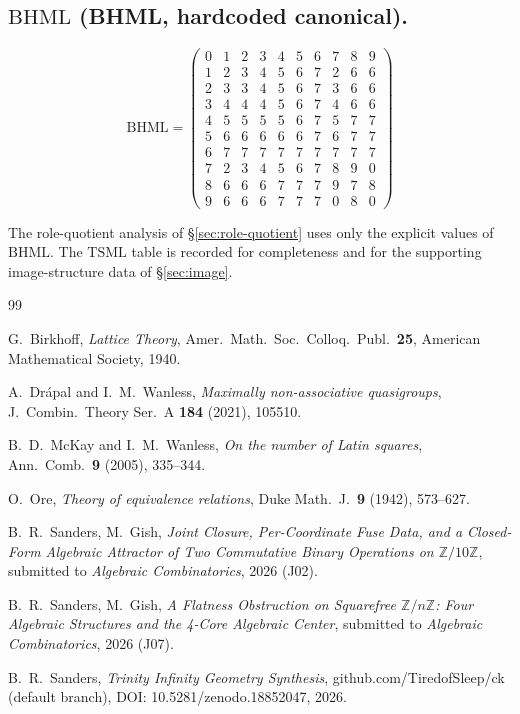 \documentclass[11pt,reqno]{amsart}
\theoremstyle{plain}
\theoremstyle{definition}
\theoremstyle{remark}
\newcommand{\Z}{\mathbb{Z}}
\newcommand{\TS}{\mathrm{TSML}}
\newcommand{\BH}{\mathrm{BHML}}
\begin{document}
\subsection*{$\BH$ (BHML, hardcoded canonical).}

\[
\BH =
\begin{pmatrix}
0 & 1 & 2 & 3 & 4 & 5 & 6 & 7 & 8 & 9 \\
1 & 2 & 3 & 4 & 5 & 6 & 7 & 2 & 6 & 6 \\
2 & 3 & 3 & 4 & 5 & 6 & 7 & 3 & 6 & 6 \\
3 & 4 & 4 & 4 & 5 & 6 & 7 & 4 & 6 & 6 \\
4 & 5 & 5 & 5 & 5 & 6 & 7 & 5 & 7 & 7 \\
5 & 6 & 6 & 6 & 6 & 6 & 7 & 6 & 7 & 7 \\
6 & 7 & 7 & 7 & 7 & 7 & 7 & 7 & 7 & 7 \\
7 & 2 & 3 & 4 & 5 & 6 & 7 & 8 & 9 & 0 \\
8 & 6 & 6 & 6 & 7 & 7 & 7 & 9 & 7 & 8 \\
9 & 6 & 6 & 6 & 7 & 7 & 7 & 0 & 8 & 0
\end{pmatrix}
\]

The role-quotient analysis of \S\ref{sec:role-quotient} uses only
the explicit values of $\BH$. The $\TS$ table is recorded for
completeness and for the supporting image-structure data of
\S\ref{sec:image}.

\begin{thebibliography}{99}

 G.~Birkhoff,
\emph{Lattice Theory},
Amer.\ Math.\ Soc.\ Colloq.\ Publ.\ \textbf{25},
American Mathematical Society, 1940.

A.~Dr\'apal and I.~M.~Wanless,
\emph{Maximally non-associative quasigroups},
J.\ Combin.\ Theory Ser.\ A \textbf{184} (2021), 105510.

 B.~D.~McKay and I.~M.~Wanless,
\emph{On the number of Latin squares},
Ann.\ Comb.\ \textbf{9} (2005), 335--344.

 O.~Ore,
\emph{Theory of equivalence relations},
Duke Math.\ J.\ \textbf{9} (1942), 573--627.

 B.~R.~Sanders, M.~Gish,
\emph{Joint Closure, Per-Coordinate Fuse Data, and a Closed-Form
Algebraic Attractor of Two Commutative Binary Operations on
$\Z/10\Z$},
submitted to \emph{Algebraic Combinatorics}, 2026 (J02).

 B.~R.~Sanders, M.~Gish,
\emph{A Flatness Obstruction on Squarefree $\Z/n\Z$: Four Algebraic
Structures and the 4-Core Algebraic Center},
submitted to \emph{Algebraic Combinatorics}, 2026 (J07).

 B.~R.~Sanders,
\emph{Trinity Infinity Geometry Synthesis},
github.com/TiredofSleep/ck (default branch),
DOI: 10.5281/zenodo.18852047, 2026.

\end{thebibliography}
\end{document}
